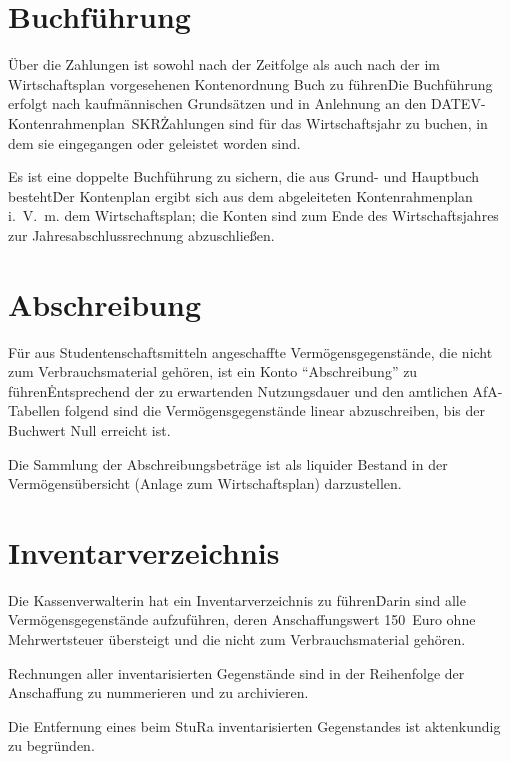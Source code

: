 {\begin{multicols}{2}
\section{Buchführung}

\Abs \Satz Über die Zahlungen ist sowohl nach der Zeitfolge als auch nach der im Wirtschaftsplan vorgesehenen Kontenordnung Buch zu führen\. Die Buchführung erfolgt nach kaufmännischen Grundsätzen und in Anlehnung an den DATEV-Kontenrahmenplan~SKR\. Zahlungen sind für das Wirtschaftsjahr zu buchen, in dem sie eingegangen oder geleistet worden sind.

\Abs \Satz Es ist eine doppelte Buchführung zu sichern, die aus Grund- und Hauptbuch besteht\. Der Kontenplan ergibt sich aus dem abgeleiteten Kontenrahmenplan i.~V.~m. dem Wirtschaftsplan; die Konten sind zum Ende des Wirtschaftsjahres zur Jahresabschlussrechnung abzuschließen.



\section{Abschreibung}

\Abs \Satz Für aus Studentenschaftsmitteln angeschaffte Vermögensgegenstände, die nicht zum Verbrauchsmaterial gehören, ist ein Konto "`Abschreibung"' zu führen\. Entsprechend der zu erwartenden Nutzungsdauer und den amtlichen AfA-Tabellen folgend sind die Vermögensgegenstände linear abzuschreiben, bis der Buchwert Null erreicht ist.

\Abs \Satz Die Sammlung der Abschreibungsbeträge ist als liquider Bestand in der Vermögensübersicht (Anlage zum Wirtschaftsplan) darzustellen.



\section{Inventarverzeichnis}

\Abs \Satz Die Kassenverwalterin hat ein Inventarverzeichnis zu führen\. Darin sind alle Vermögensgegenstände aufzuführen, deren Anschaffungswert 150~Euro ohne Mehrwertsteuer übersteigt und die nicht zum Verbrauchsmaterial gehören.

\Abs \Satz Rechnungen aller inventarisierten Gegenstände sind in der Reihenfolge der Anschaffung zu nummerieren und zu archivieren.

\Abs \Satz Die Entfernung eines beim StuRa inventarisierten Gegenstandes ist aktenkundig zu begründen.


\end{multicols}}
